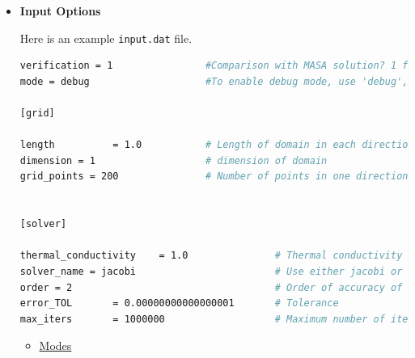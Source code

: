 \documentclass[12 pt, final]{article}
\begin{document}
\begin{itemize}
\begin{itemize}
        \texttt{curve\_1D\_plotter.script} and \texttt{surface\_2D\_plotter.script} create 1D curves (\texttt{plot.png}) and 2D surfaces (\texttt{surface.png}) for the temperature fields that get stored in \texttt{output.log} or \texttt{output\_100x100.log}.
    
    \item \underline{Various output files}
    
    \texttt{reference\_sol\_*.log} contain reference solutions created using \texttt{mesh\_size\_change.sh} for regression testing using \texttt{TOL = 1e-17} and \texttt{MAX\_ITERS= 1000000}.
    
    \texttt{convergence\_*.png} contains images of convergence analysis, created by \texttt{mesh\_size\_change.sh}
    
    \texttt{output.log} contains the position vs Temperature data, created by \texttt{main.cpp}. It gets updated every time the executable is run.
    
    \texttt{output\_100x100.log} is a snapshot solution of a 100x100 grid with gauss-seidel 4th order to plot surface plots.
    
    \texttt{output\_*.dat} is created by \texttt{mesh\_size\_change.sh} annd contains data on n, L2 error and time taken.
    
    \texttt{plot.png} has the 1D temperature vs x plot

    \texttt{surface.png} has the surface plot for temperature over a 2D domain.
    \end{itemize}
    \item \textbf{Input Options}
    
    Here is an example \texttt{input.dat} file.
    \begin{lstlisting}[language = bash, basicstyle=\tiny]
verification = 1                #Comparison with MASA solution? 1 for yes; no otherwise; Always keep as 1. Otherwise a couple of regression tests might fail.
mode = debug                    #To enable debug mode, use 'debug', anything else is normal mode.

[grid]

length			= 1.0		    # Length of domain in each direction
dimension = 1                   # dimension of domain
grid_points = 200               # Number of points in one direction


[solver]

thermal_conductivity 	= 1.0	            # Thermal conductivity k_0	 
solver_name = jacobi                        # Use either jacobi or gauss
order = 2                                   # Order of accuracy of stencil, use 2 or 4
error_TOL		= 0.00000000000000001	    # Tolerance
max_iters		= 1000000		            # Maximum number of iterations
    \end{lstlisting}
    \begin{itemize}
        \item \underline{Modes}
        

\end{itemize}
\end{itemize}
\end{document}
